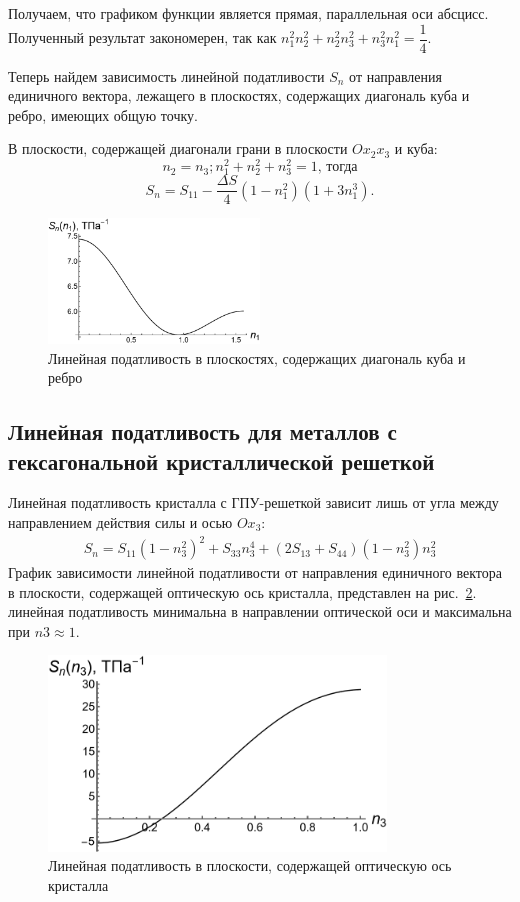 \documentclass[12pt, a4paper]{article}
\begin{document}
 Получаем, что графиком функции является прямая, параллельная оси абсцисс. Полученный результат закономерен, так как $n_1^2 n_2^2 + n_2^2 n_3^2 + n_3^2 n_1^2 = \dfrac{1}{4}$.
 
 Теперь найдем зависимость линейной податливости $S_n$ от направления единичного вектора, лежащего в плоскостях, содержащих диагональ куба и ребро, имеющих общую точку.
 
В плоскости, содержащей диагонали грани в плоскости $O x_2 x_3$ и куба: 
\[
n_2 = n_3; n_1^2 + n_2^2 + n_3^2 = 1 \text{, тогда}
\]
\[
S_n = S_{11} - \frac{\Delta{S}}{4} \left(1 - n_1^2\right) \left(1 + 3 n_1^3\right).
\]
 \begin{figure}[!htbp]
 	\centering
 	\includegraphics[width=0.5\textwidth]{pic-6}%
 	\caption{Линейная податливость в плоскостях, содержащих диагональ куба и ребро}
 	\vspace*{-2mm}
 	\label{lin-grani-2-kuba}
 \end{figure}

\newpage

\subsection{Линейная податливость для металлов с гексагональной кристаллической решеткой}
Линейная податливость кристалла с ГПУ-решеткой зависит лишь от угла между
направлением действия силы и осью $Ox_3:$
\begin{gather}
	\label{lin-geks-form}
S_n = S_{11} \left(1 - n_3^2\right)^2 + S_{33} n_3^4
 + (2 S_{13} + S_{44}) (1 - n^2_3)n^2_3
\end{gather}
График зависимости линейной податливости от направления единичного вектора
в плоскости, содержащей оптическую ось кристалла, представлен на рис.~\ref{lin-pod-v-plock-krsit-pic-4}. линейная податливость минимальна в направлении оптической оси и максимальна при
$n3 \approx 1$.
\begin{figure}[!htbp]
	\centering
	\includegraphics[width=0.8\textwidth]{pic-4}%
	\caption{Линейная податливость в плоскости, содержащей оптическую ось кристалла}
	\vspace*{-2mm}
	\label{lin-pod-v-plock-krsit-pic-4}
\end{figure}
\end{document}
